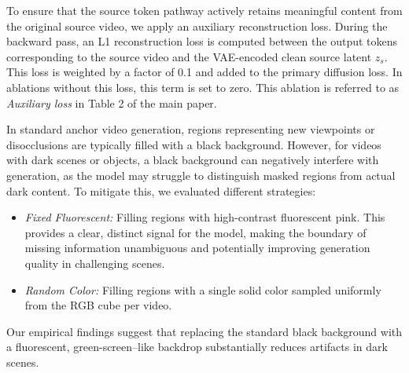 \begin{description}[noitemsep, topsep=0pt, partopsep=0pt, leftmargin=0pt, style=unboxed, font=\normalfont\bfseries]
    \item[Source Token Reconstruction Loss] To ensure that the source token pathway actively retains meaningful content from the original source video, we apply an auxiliary reconstruction loss. During the backward pass, an L1 reconstruction loss is computed between the output tokens corresponding to the source video and the VAE-encoded clean source latent $z_s$. This loss is weighted by a factor of 0.1 and added to the primary diffusion loss. In ablations without this loss, this term is set to zero. This ablation is referred to as \textit{Auxiliary loss} in Table 2 of the main paper.

    \item[Anchor Background Treatment] In standard anchor video generation, regions representing new viewpoints or disocclusions are typically filled with a black background. However, for videos with dark scenes or objects, a black background can negatively interfere with generation, as the model may struggle to distinguish masked regions from actual dark content. To mitigate this, we evaluated different strategies:
    \begin{itemize}[noitemsep, topsep=0pt]
        \item \textit{Fixed Fluorescent:} Filling regions with high-contrast fluorescent pink. This provides a clear, distinct signal for the model, making the boundary of missing information unambiguous and potentially improving generation quality in challenging scenes.
        \item \textit{Random Color:} Filling regions with a single solid color sampled uniformly from the RGB cube per video.
    \end{itemize}
    Our empirical findings suggest that replacing the standard black background with a fluorescent, green-screen–like backdrop substantially reduces artifacts in dark scenes.


\end{description}
